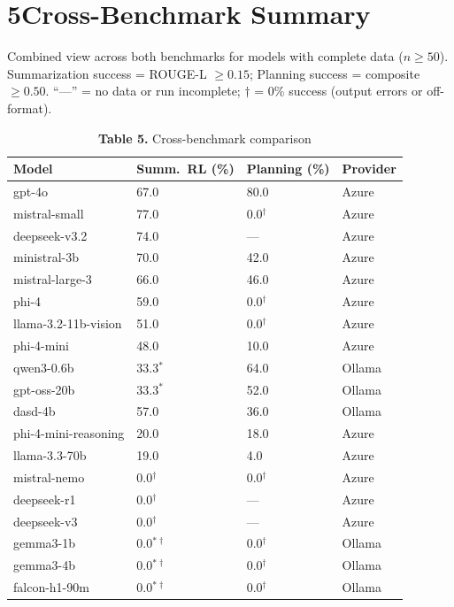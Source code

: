 \documentclass[11pt,letterpaper]{article}
\begin{document}
\section*{5\quad Cross-Benchmark Summary}

Combined view across both benchmarks for models with complete data ($n \geq 50$).
Summarization success = ROUGE-L $\geq 0.15$; Planning success = composite $\geq 0.50$.
``---'' = no data or run incomplete; $\dagger$ = 0\% success (output errors or off-format).

\vspace{0.3cm}

\begin{table}[h!]
\centering
\caption*{\textbf{Table 5.} Cross-benchmark comparison}
\begin{tabular}{l R{2.4cm} R{2.4cm} l}
\toprule
\textbf{Model} & \textbf{Summ.\ RL (\%)} & \textbf{Planning (\%)} & \textbf{Provider} \\
\midrule
{} gpt-4o              & 67.0 & 80.0 & Azure \\
 mistral-small       & 77.0 &  0.0$^\dagger$ & Azure \\
 deepseek-v3.2       & 74.0 & --- & Azure \\
 ministral-3b        & 70.0 & 42.0 & Azure \\
mistral-large-3     & 66.0 & 46.0 & Azure \\
phi-4               & 59.0 &  0.0$^\dagger$ & Azure \\
llama-3.2-11b-vision& 51.0 &  0.0$^\dagger$ & Azure \\
phi-4-mini          & 48.0 & 10.0 & Azure \\
 qwen3-0.6b          & 33.3$^{*}$ & 64.0 & Ollama \\
 gpt-oss-20b         & 33.3$^{*}$ & 52.0 & Ollama \\
 dasd-4b             & 57.0 & 36.0 & Ollama \\
 phi-4-mini-reasoning& 20.0 & 18.0 & Azure \\
 llama-3.3-70b       & 19.0 &  4.0 & Azure \\
 mistral-nemo        &  0.0$^\dagger$ &  0.0$^\dagger$ & Azure \\
 deepseek-r1         &  0.0$^\dagger$ & --- & Azure \\
 deepseek-v3         &  0.0$^\dagger$ & --- & Azure \\
 gemma3-1b           &  0.0$^{*\dagger}$ &  0.0$^\dagger$ & Ollama \\
 gemma3-4b           &  0.0$^{*\dagger}$ &  0.0$^\dagger$ & Ollama \\
 falcon-h1-90m       &  0.0$^{*\dagger}$ &  0.0$^\dagger$ & Ollama \\
\bottomrule
\end{tabular}


\end{table}
\end{document}
